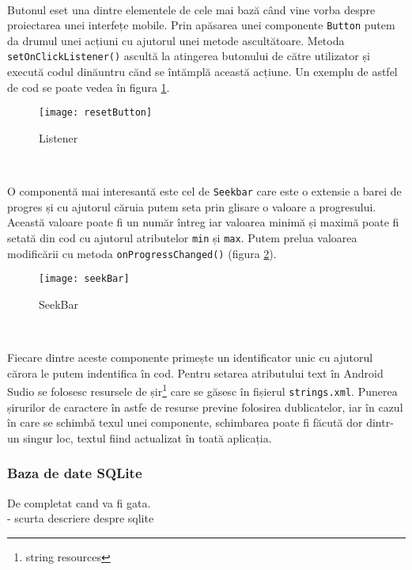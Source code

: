 \documentclass[../IoMusT.tex]{subfiles}
\begin{document}
\\
\par Butonul eset una dintre elementele de cele mai bază când vine vorba despre proiectarea unei interfețe mobile. Prin apăsarea unei componente \verb|Button| putem da drumul unei acțiuni cu ajutorul unei metode ascultătoare. Metoda \verb|setOnClickListener()| ascultă la atingerea butonului de către utilizator și execută codul dinăuntru cănd se întămplă această acțiune. Un exemplu de astfel de cod se poate vedea în figura \ref{fig:reset}.
\begin{figure}[h]
\centering
\texttt{[image: resetButton]}
\caption{Listener}
\label{fig:reset}
\end{figure}
\\
\par O componentă mai interesantă este cel de \verb|Seekbar| care este o extensie a barei de progres și cu ajutorul căruia putem seta prin glisare o valoare a progresului. Această valoare poate fi un număr întreg iar valoarea minimă și maximă poate fi setată din cod cu ajutorul atributelor \verb|min| și \verb|max|. Putem prelua valoarea modificării cu metoda \verb|onProgressChanged()| (figura \ref{fig:seek}).
\begin{figure}[h]
\centering
\texttt{[image: seekBar]}
\caption{SeekBar}
\label{fig:seek}
\end{figure}
\\
\par Fiecare dintre aceste componente primește un identificator unic cu ajutorul cărora le putem indentifica în cod. Pentru setarea atributului text în Android Sudio se folosesc resursele de șir\footnote{string resources} care se găsesc în fișierul \verb|strings.xml|. Punerea șirurilor de caractere în astfe de resurse previne folosirea dublicatelor, iar în cazul în care se schimbă texul unei componente, schimbarea poate fi făcută dor dintr-un singur loc, textul fiind actualizat în toată aplicația.

\subsubsection{Baza de date SQLite}
De completat cand va fi gata.
\\
- scurta descriere despre sqlite
\end{document}
